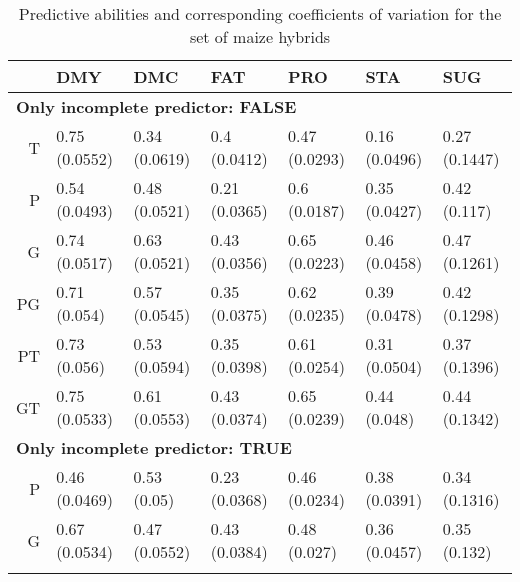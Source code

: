 \documentclass[12pt,titlepage]{article}
\begin{document}
\begin{table}[ht]
\centering
\caption{Predictive abilities and corresponding coefficients of variation for the set of maize hybrids} 
\begin{tabular}{rllllll}
  \toprule
 & DMY & DMC & FAT & PRO & STA & SUG \\ 
  \midrule
\multicolumn{6}{l}{{\bfseries Only incomplete predictor: FALSE}}\\
T & 0.75 (0.0552) & 0.34 (0.0619) & 0.4 (0.0412) & 0.47 (0.0293) & 0.16 (0.0496) & 0.27 (0.1447) \\ 
  P & 0.54 (0.0493) & 0.48 (0.0521) & 0.21 (0.0365) & 0.6 (0.0187) & 0.35 (0.0427) & 0.42 (0.117) \\ 
  G & 0.74 (0.0517) & 0.63 (0.0521) & 0.43 (0.0356) & 0.65 (0.0223) & 0.46 (0.0458) & 0.47 (0.1261) \\ 
  PG & 0.71 (0.054) & 0.57 (0.0545) & 0.35 (0.0375) & 0.62 (0.0235) & 0.39 (0.0478) & 0.42 (0.1298) \\ 
  PT & 0.73 (0.056) & 0.53 (0.0594) & 0.35 (0.0398) & 0.61 (0.0254) & 0.31 (0.0504) & 0.37 (0.1396) \\ 
  GT & 0.75 (0.0533) & 0.61 (0.0553) & 0.43 (0.0374) & 0.65 (0.0239) & 0.44 (0.048) & 0.44 (0.1342) \\ 
   \midrule
\multicolumn{6}{l}{{\bfseries Only incomplete predictor: TRUE}}\\
P & 0.46 (0.0469) & 0.53 (0.05) & 0.23 (0.0368) & 0.46 (0.0234) & 0.38 (0.0391) & 0.34 (0.1316) \\ 
  G & 0.67 (0.0534) & 0.47 (0.0552) & 0.43 (0.0384) & 0.48 (0.027) & 0.36 (0.0457) & 0.35 (0.132) \\ 
   \bottomrule
\multicolumn{6}{l}{}\\
\end{tabular}
\end{table}
\end{document}
